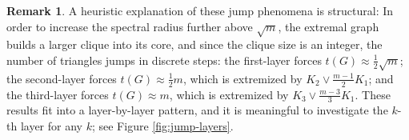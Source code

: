 \documentclass[11pt,a4paper]{article}
\theoremstyle{definition}
\newtheorem{remark}{Remark}
\theoremstyle{plain}
\begin{document}
 \begin{remark} 
A heuristic explanation of these jump phenomena is structural:  
In order to increase the spectral radius 
further above $\sqrt{m}$, 
the extremal graph builds a larger clique into its core, 
and since the clique size is an integer, the number of triangles jumps in discrete steps: the first-layer forces $t(G)\approx \tfrac{1}{2}\sqrt{m}$; the second-layer forces $t(G)\approx \tfrac{1}{2}m$, which is extremized by $K_2\vee \tfrac{m-1}{2}K_1$; and the third-layer forces $t(G)\approx m$, which is extremized by $K_3\vee \tfrac{m-3}{3}K_1$. These results fit into a  layer-by-layer pattern, and   
it is meaningful to investigate the $k$-th 
layer for any $k$; see Figure \ref{fig:jump-layers}.  
 \end{remark}
 
 
 \vspace{-4mm}
\end{document}
